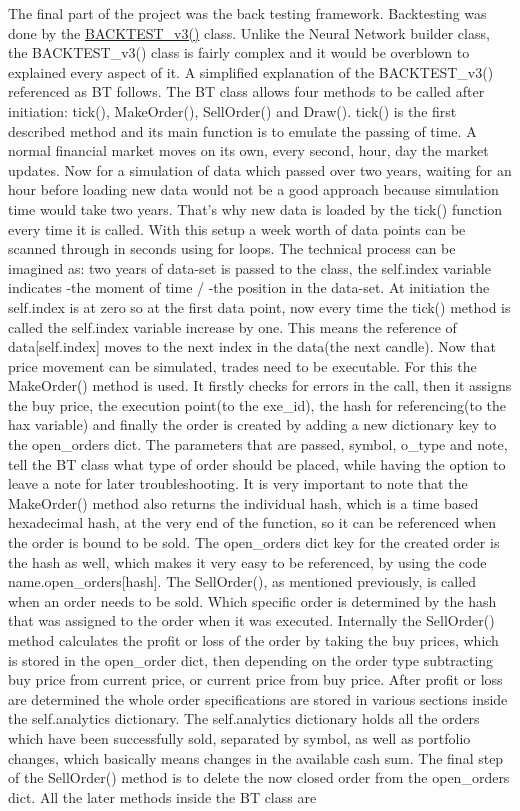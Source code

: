 \documentclass{article}
\begin{document}
The final part of the project was the back testing framework. Backtesting was done by the \href{https://colab.research.google.com/drive/1KucTlScag3R0D2piUODHtQ1eAmDSQ2Rv#scrollTo=MXbGIyR4KJiJ}{BACKTEST\_v3()} class. Unlike the Neural Network builder class, the BACKTEST\_v3() class is fairly complex and it would be overblown to explained every aspect of it. A simplified explanation of the BACKTEST\_v3() referenced as BT follows. The BT class allows four methods to be called after initiation: tick(), MakeOrder(), SellOrder() and Draw(). tick() is the first described method and its main function is to emulate the passing of time. A normal financial market moves on its own, every second, hour, day the market updates. Now for a simulation of data which passed over two years, waiting for an hour before loading new data would not be a good approach because simulation time would take two years. That's why new data is loaded by the tick() function every time it is called. With this setup a week worth of data points can be scanned through in seconds using for loops. The technical process can be imagined as: two years of data-set is passed to the class, the self.index variable indicates -the moment of time / -the position in the data-set. At initiation the self.index is at zero so at the first data point, now every time the tick() method is called the self.index variable increase by one. This means the reference of data[self.index] moves to the next index in the data(the next candle). Now that price movement can be simulated, trades need to be executable. For this the MakeOrder() method is used. It firstly checks for errors in the call, then it assigns the buy price, the execution point(to the exe\_id), the hash for referencing(to the hax variable) and finally the order is created by adding a new dictionary key to the open\_orders dict. The parameters that are passed, symbol, o\_type and note, tell the BT class what type of order should be placed, while having the option to leave a note for later troubleshooting. It is very important to note that the MakeOrder() method also returns the individual hash, which is a time based hexadecimal hash, at the very end of the function, so it can be referenced when the order is bound to be sold. The open\_orders dict key for the created order is the hash as well, which makes it very easy to be referenced, by using the code name.open\_orders[hash]. The SellOrder(), as mentioned previously, is called when an order needs to be sold. Which specific order is determined by the hash that was assigned to the order when it was executed. Internally the SellOrder() method calculates the profit or loss of the order by taking the buy prices, which is stored in the open\_order dict, then depending on the order type subtracting buy price from current price, or current price from buy price. After profit or loss are determined the whole order specifications are stored in various sections inside the self.analytics dictionary. The self.analytics dictionary holds all the orders which have been successfully sold, separated by symbol, as well as portfolio changes, which basically means changes in the available cash sum. The final step of the SellOrder() method is to delete the now closed order from the open\_orders dict. All the later methods inside the BT class are 
\end{document}
